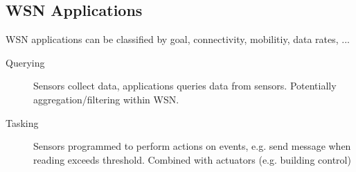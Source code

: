 \subsection{WSN Applications}

WSN applications can be classified by goal, connectivity, mobilitiy, data
rates, ...

\begin{description}
		\item[Querying] Sensors collect data, applications queries data from
				sensors. Potentially aggregation/filtering within WSN.
		\item[Tasking] Sensors programmed to perform actions on events, e.g.
				send message when reading exceeds threshold. Combined with
				actuators (e.g. building control)
\end{description}

